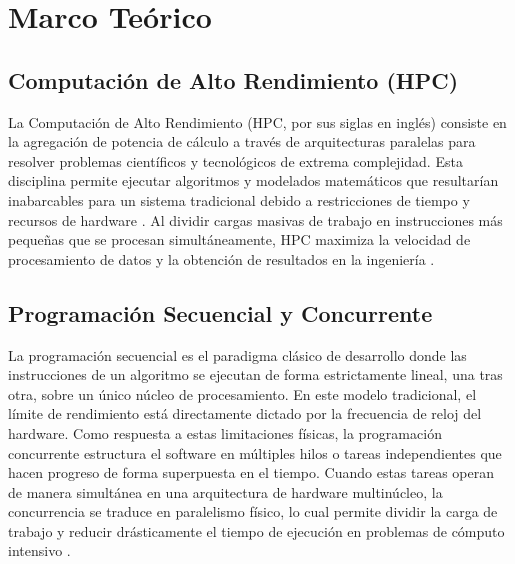 \section{Marco Teórico}

\subsection{Computación de Alto Rendimiento (HPC)}
La Computación de Alto Rendimiento (HPC, por sus siglas en inglés) consiste en la agregación de potencia de cálculo a través de arquitecturas paralelas para resolver problemas científicos y tecnológicos de extrema complejidad. Esta disciplina permite ejecutar algoritmos y modelados matemáticos que resultarían inabarcables para un sistema tradicional debido a restricciones de tiempo y recursos de hardware \parencite{Hager2010HPC}. Al dividir cargas masivas de trabajo en instrucciones más pequeñas que se procesan simultáneamente, HPC maximiza la velocidad de procesamiento de datos y la obtención de resultados en la ingeniería \parencite{Patterson2017Computer}.

\subsection{Programación Secuencial y Concurrente}
La programación secuencial es el paradigma clásico de desarrollo donde las instrucciones de un algoritmo se ejecutan de forma estrictamente lineal, una tras otra, sobre un único núcleo de procesamiento. En este modelo tradicional, el límite de rendimiento está directamente dictado por la frecuencia de reloj del hardware. Como respuesta a estas limitaciones físicas, la programación concurrente estructura el software en múltiples hilos o tareas independientes que hacen progreso de forma superpuesta en el tiempo. Cuando estas tareas operan de manera simultánea en una arquitectura de hardware multinúcleo, la concurrencia se traduce en paralelismo físico, lo cual permite dividir la carga de trabajo y reducir drásticamente el tiempo de ejecución en problemas de cómputo intensivo \parencite{BenAri2006Concurrent}.

